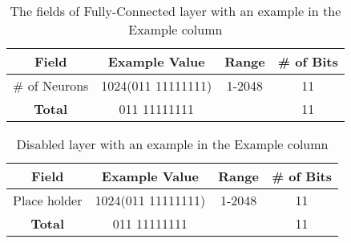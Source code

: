 \documentclass[conference]{IEEEtran}
\begin{document}
\begin{table}[!t]
	\renewcommand{\arraystretch}{1.3}
	\caption{The fields of Fully-Connected layer with an example in the Example column}
	\label{table:FullFields}
	\centering
	\begin{tabular}{|c|c|c|c|}
		\hline
		Field & Example Value & Range & \# of Bits\\
		\hline
		\# of Neurons & 1024(011 11111111) & 1-2048 & 11\\
		\hline
		\textbf{Total} & 011 11111111 &  & 11\\
		\hline
	\end{tabular}
\end{table}

\begin{table}[!t]
	\renewcommand{\arraystretch}{1.3}
	\caption{Disabled layer with an example in the Example column}
	\label{table:DisabledFields}
	\centering
	\begin{tabular}{|c|c|c|c|}
		\hline
		Field & Example Value & Range & \# of Bits\\
		\hline
		Place holder & 1024(011 11111111) & 1-2048 & 11\\
		\hline
		\textbf{Total} & 011 11111111 &  & 11\\
		\hline
	\end{tabular}
\end{table}
\end{document}
